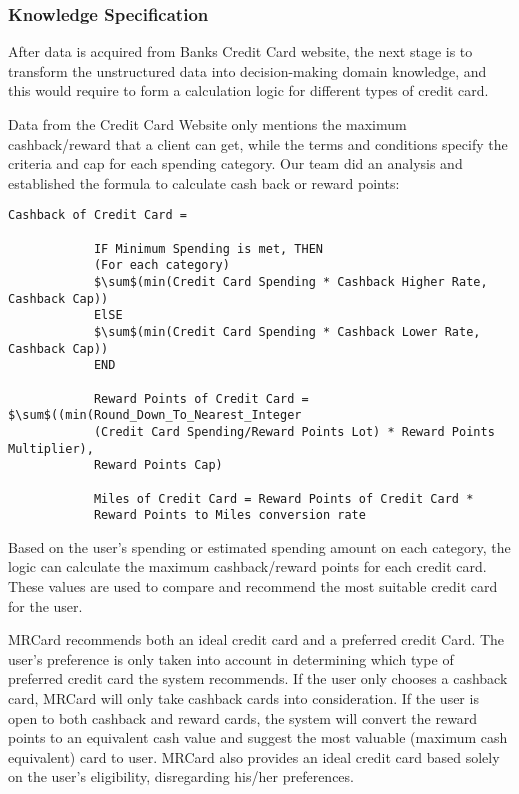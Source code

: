 	\subsubsection{Knowledge Specification} %
	\label{ssub:knowledge_specification}
		After data is acquired from Banks Credit Card website, the next stage is to transform the unstructured data into decision-making domain knowledge, and this would require to form a calculation logic for different types of credit card.

		Data from the Credit Card Website only mentions the maximum cashback/reward that a client can get, while the terms and conditions specify the criteria and cap for each spending category. Our team did an analysis and established the formula to calculate cash back or reward points:

		\lstset{basicstyle=\footnotesize\ttfamily}
		\begin{lstlisting}[frame=single, gobble=11, tabsize=4, showstringspaces=false, mathescape]
			Cashback of Credit Card =

			IF Minimum Spending is met, THEN
			(For each category)
			$\sum$(min(Credit Card Spending * Cashback Higher Rate, Cashback Cap))
			ElSE
			$\sum$(min(Credit Card Spending * Cashback Lower Rate, Cashback Cap))
			END

			Reward Points of Credit Card = $\sum$((min(Round_Down_To_Nearest_Integer
			(Credit Card Spending/Reward Points Lot) * Reward Points Multiplier),
			Reward Points Cap)

			Miles of Credit Card = Reward Points of Credit Card *
			Reward Points to Miles conversion rate
		\end{lstlisting}

		Based on the user’s spending or estimated spending amount on each category, the logic can calculate the maximum cashback/reward points for each credit card. These values are used to compare and recommend the most suitable credit card for the user.

		MRCard recommends both an ideal credit card and a preferred credit Card. The user’s preference is only taken into account in determining which type of preferred credit card the system recommends. If the user only chooses a cashback card, MRCard will only take cashback cards into consideration. If the user is open to both cashback and reward cards, the system will convert the reward points to an equivalent cash value and suggest the most valuable (maximum cash equivalent) card to user. MRCard also provides an ideal credit card based solely on the user’s eligibility, disregarding his/her preferences.

